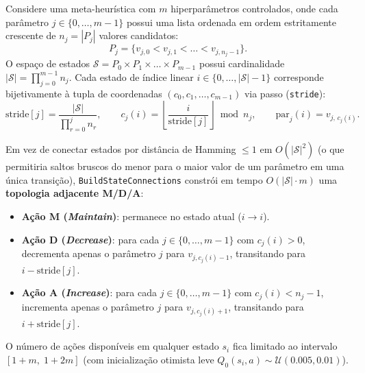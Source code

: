 \documentclass[11pt,a4paper]{article}
\begin{document}
Considere uma meta-heurística com $m$ hiperparâmetros controlados, onde cada parâmetro $j \in \{0, \dots, m-1\}$ possui uma lista ordenada em ordem estritamente crescente de $n_j = |P_j|$ valores candidatos:
\begin{equation}
  P_j = \big\{ v_{j,0} < v_{j,1} < \dots < v_{j, n_j - 1} \big\}.
\end{equation}
O espaço de estados $\mathcal{S} = P_0 \times P_1 \times \dots \times P_{m-1}$ possui cardinalidade $|\mathcal{S}| = \prod_{j=0}^{m-1} n_j$. Cada estado de índice linear $i \in \{0, \dots, |\mathcal{S}|-1\}$ corresponde bijetivamente à tupla de coordenadas $(c_0, c_1, \dots, c_{m-1})$ via passo (\texttt{stride}):
\begin{equation}
  \text{stride}[j] = \frac{|\mathcal{S}|}{\prod_{r=0}^{j} n_r},
  \qquad
  c_j(i) = \left\lfloor \frac{i}{\text{stride}[j]} \right\rfloor \bmod n_j,
  \qquad
  \text{par}_j(i) = v_{j,\, c_j(i)}.
  \label{eq:stride}
\end{equation}

Em vez de conectar estados por distância de Hamming $\le 1$ em $O(|\mathcal{S}|^2)$ (o que permitiria saltos bruscos do menor para o maior valor de um parâmetro em uma única transição), \texttt{BuildStateConnections} constrói em tempo $O(|\mathcal{S}|\cdot m)$ uma \textbf{topologia adjacente M/D/A}:
\begin{itemize}[leftmargin=*]
  \item \textbf{Ação M (\emph{Maintain})}: permanece no estado atual ($i \to i$).
  \item \textbf{Ação D (\emph{Decrease})}: para cada $j \in \{0,\dots,m-1\}$ com $c_j(i) > 0$, decrementa apenas o parâmetro $j$ para $v_{j, c_j(i)-1}$, transitando para $i - \text{stride}[j]$.
  \item \textbf{Ação A (\emph{Increase})}: para cada $j \in \{0,\dots,m-1\}$ com $c_j(i) < n_j - 1$, incrementa apenas o parâmetro $j$ para $v_{j, c_j(i)+1}$, transitando para $i + \text{stride}[j]$.
\end{itemize}
O número de ações disponíveis em qualquer estado $s_i$ fica limitado ao intervalo $[1 + m,\; 1 + 2m]$ (com inicialização otimista leve $Q_0(s_i, a) \sim \mathcal{U}(0.005, 0.01)$).
\end{document}
